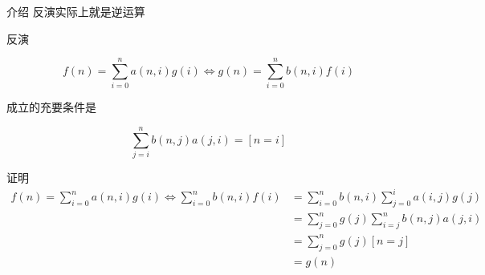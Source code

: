 \begin{frame}[fragile]{介绍}
	反演实际上就是逆运算
\end{frame}


\begin{frame}{反演}
	\begin{lemma}[反演]
		\label{incexc:lm:inv}

		\begin{equation}
			\label{incexc:eq:inv}
			f(n)=\sum_{i=0}^n a(n,i)g(i)\iff g(n)=\sum_{i=0}^n b(n,i)f(i)
		\end{equation}

		成立的充要条件是

		\begin{equation}
			\label{incexc:eq:inv2}
			\sum_{j=i}^n b(n,j)a(j,i)=[n=i]
		\end{equation}
	\end{lemma}
\end{frame}


\begin{frame}{证明}
	\[
		\begin{aligned}
			f(n)=\sum_{i=0}^n a(n,i)g(i)\iff\sum_{i=0}^n b(n,i)f(i) & =\sum_{i=0}^n b(n,i)\sum_{j=0}^i a(i,j)g(j) \\
			                                                        & =\sum_{j=0}^ng(j)\sum_{i=j}^nb(n,j)a(j,i)   \\
			                                                        & =\sum_{j=0}^ng(j)[n=j]                      \\
			                                                        & =g(n)
		\end{aligned}
	\]
\end{frame}
